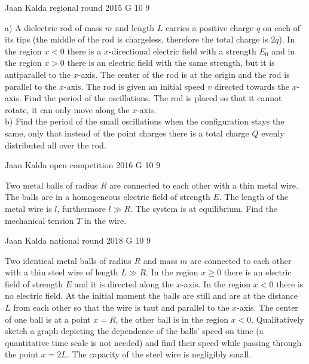 \documentclass[11pt]{article}
\begin{document}
{Jaan Kalda} %
{regional round} %
{2015} %
{G 10} %
{9} %
{

\ifEngStatement
a) A dielectric rod of mass $m$ and length $L$ carries a positive charge $q$ on each of its tips (the middle of the rod is chargeless, therefore the total charge is $2q$). In the region $x<0$ there is a $x$-directional electric field with a strength $E_0$ and in the region $x>0$ there is an electric field with the same strength, but it is antiparallel to the $x$-axis. The center of the rod is at the origin and the rod is parallel to the $x$-axis. The rod is given an initial speed $v$ directed towards the $x$-axis. Find the period of the oscillations. The rod is placed so that it cannot rotate, it can only move along the $x$-axis.\\
b) Find the period of the small oscillations when the configuration stays the same, only that instead of the point charges there is a total charge $Q$ evenly distributed all over the rod.
\fi
}

{Jaan Kalda} %
{open competition} %
{2016} %
{G 10} %
{9} %
{

\ifEngStatement
Two metal balls of radius $R$ are connected to each other with a thin metal wire. The balls are in a homogeneous electric field of strength $E$. The length of the metal wire is $l$, furthermore $l\gg R$. The system is at equilibrium. Find the mechanical tension $T$ in the wire.
\fi
}

{Jaan Kalda} %
{national round} %
{2018} %
{G 10} %
{9} %
{

\ifEngStatement
Two identical metal balls of radius $R$ and mass $m$ are connected to each other with a thin steel wire of length $L\gg R$. In the region $x\ge 0$ there is an electric field of strength $E$ and it is directed along the $x$-axis. In the region $x< 0$ there is no electric field. At the initial moment the balls are still and are at the distance $L$ from each other so that the wire is taut and parallel to the $x$-axis. The center of one ball is at a point $x=R$, the other ball is in the region $x<0$. Qualitatively sketch a graph depicting the dependence of the balls’ speed on time (a quantitative time scale is not needed) and find their speed while passing through the point $x=2L$. The capacity of the steel wire is negligibly small.
\fi
}
\end{document}
